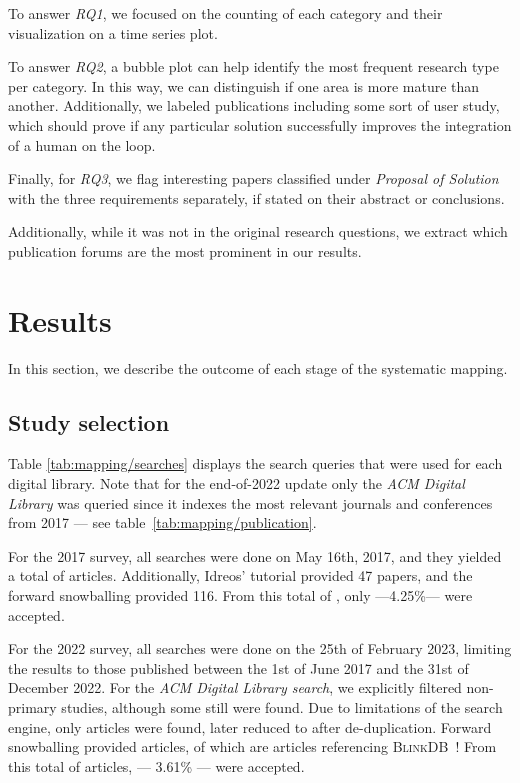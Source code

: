 To answer \emph{RQ1}, we focused on the counting of each category
and their visualization on a time series plot.

To answer \emph{RQ2}, a bubble plot can help identify
the most frequent research type per category. In this way, we can distinguish if
one area is more mature than another. Additionally, we labeled
publications including some sort of user study, which should prove
if any particular solution successfully improves the integration of a
human on the loop.

Finally, for \emph{RQ3}, we flag interesting papers classified under
\emph{Proposal of Solution} with the three requirements separately, if stated
on their abstract or conclusions.

Additionally, while it was not in the original research questions, we
extract which publication forums are the most prominent in our results.

\section{Results}
\label{sec:mapping/results}
In this section, we describe the outcome of each stage of the systematic mapping.

\subsection{Study selection}
Table \ref{tab:mapping/searches} displays the search queries that were used for
each digital library. Note that for the end-of-2022 update only the \emph{ACM Digital Library}
was queried since it indexes the most relevant journals and conferences from 2017 ---
see table~\ref{tab:mapping/publication}.

For the 2017 survey, all searches were done on May 16th, 2017, and they yielded a total of  articles.
Additionally, Idreos' tutorial provided 47 papers, and the forward snowballing provided 116.
From this total of , only  ---4.25\%--- were accepted.

For the 2022 survey, all searches were done on the 25th of February 2023, limiting the results 
to those published between the 1st of June 2017 and the 31st of December 2022. For the \emph{ACM
Digital Library search}, we explicitly filtered non-primary studies, although some still were found.
Due to limitations of the search engine, only  articles were found, later reduced to 
 after de-duplication\footnotemark. Forward snowballing provided  articles, 
of which  are articles referencing \textsc{BlinkDB}~\cite{Agarwal2013}!
From this total of  articles,  --- 3.61\% --- were accepted.

